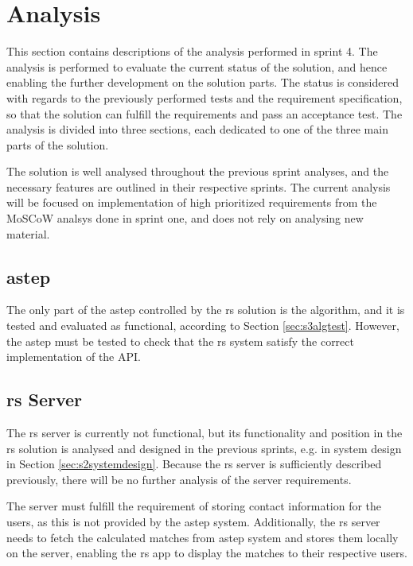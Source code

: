 \section{Analysis}
This section contains descriptions of the analysis performed in sprint 4.
The analysis is performed to evaluate the current status of the solution, and hence enabling the further development on the solution parts.
The status is considered with regards to the previously performed tests and the requirement specification, so that the solution can fulfill the requirements and pass an acceptance test.
The analysis is divided into three sections, each dedicated to one of the three main parts of the solution.

The solution is well analysed throughout the previous sprint analyses, and the necessary features are outlined in their respective sprints.
The current analysis will be focused on implementation  of high prioritized requirements from the MoSCoW analsys done in sprint one, and does not rely on analysing new material.


\subsection{\gls{astep}}
The only part of the \gls{astep} controlled by the \gls{rs} solution is the algorithm, and it is tested and evaluated as functional, according to Section \ref{sec:s3algtest}. However, the \gls{astep} must be tested to check that the \gls{rs} system satisfy the correct implementation of the API. 


\subsection{\gls{rs} Server}
The \gls{rs} server is currently not functional, but its functionality and position in the \gls{rs} solution is analysed and designed in the previous sprints, e.g. in system design in Section \ref{sec:s2systemdesign}. Because the \gls{rs} server is sufficiently described previously, there will be no further analysis of the server requirements.

The server must fulfill the requirement of storing contact information for the users, as this is not provided by the \gls{astep} system.
Additionally, the \gls{rs} server needs to fetch the calculated matches from \gls{astep} system and stores them locally on the server, enabling the \gls{rs} app to display the matches to their respective users.



